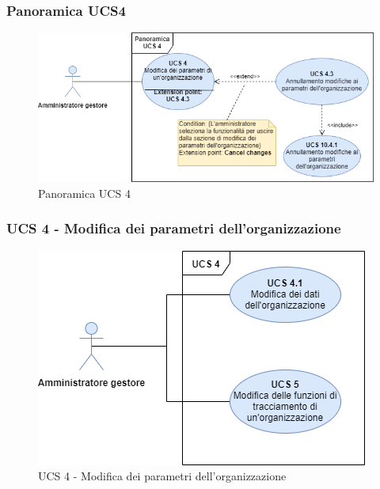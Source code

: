 \subsubsection{Panoramica UCS4}

\begin{figure}[h]
	\centering	
	\includegraphics[scale=0.53]{Sezioni/UseCase/Immagini/PanoramicaUCS4.png}
	\caption{Panoramica UCS 4}
\end{figure}

\subsubsection{UCS 4 - Modifica dei parametri dell'organizzazione}%

\begin{figure}[h]
	\centering	
	\includegraphics[scale=0.53]{Sezioni/UseCase/Immagini/UCS4.png}
	\caption{UCS 4 - Modifica dei parametri dell'organizzazione}
\end{figure}


